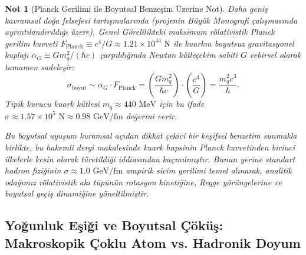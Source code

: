 \documentclass[11pt,a4paper]{article}
\newtheorem{remark}{Not}[section]
\begin{document}
\begin{remark}[Planck Gerilimi ile Boyutsal Benzeşim Üzerine Not]
    \label{rem:planck_boyut_tr}
    Daha geniş kavramsal doğa felsefesi tartışmalarında (projenin Büyük Monografi çalışmasında ayrıntılandırıldığı üzere), Genel Görelilikteki maksimum rölativistik Planck gerilim kuvveti $F_{\mathrm{Planck}} \equiv c^4/G \approx 1.21 \times 10^{44}\text{ N}$ ile kuarkın boyutsuz gravitasyonel kuplajı $\alpha_G \equiv G m_q^2 / (\hbar c)$ çarpıldığında Newton kütleçekim sabiti $G$ cebirsel olarak tamamen sadeleşir:
    \begin{equation}
        \sigma_{\mathrm{boyut}} \sim \alpha_G \cdot F_{\mathrm{Planck}} = \left( \frac{G m_q^2}{\hbar c} \right) \cdot \left( \frac{c^4}{G} \right) = \frac{m_q^2 c^3}{\hbar}.
        \label{eq:sigma_tam_analitik}
    \end{equation}
    Tipik kurucu kuark kütlesi $m_q \approx 440\text{ MeV}$ için bu ifade $\sigma \approx 1.57 \times 10^5\text{ N} \approx 0.98\text{ GeV/fm}$ değerini verir.
    
    Bu boyutsal uyuşum kuramsal açıdan dikkat çekici bir keşifsel benzetim sunmakla birlikte, bu hakemli dergi makalesinde kuark hapsinin Planck kuvvetinden birinci ilkelerle kesin olarak türetildiği iddiasından kaçınılmıştır. Bunun yerine standart hadron fiziğinin $\sigma \approx 1.0\text{ GeV/fm}$ ampirik sicim gerilimi temel alınarak, analitik odağımız rölativistik akı tüpünün rotasyon kinetiğine, Regge yörüngelerine ve boyutsal geçiş dinamiğine yöneltilmiştir.
\end{remark}

\subsection{Yoğunluk Eşiği ve Boyutsal Çöküş: Makroskopik Çoklu Atom vs. Hadronik Doyum}
\label{sec:yogunluk_ve_boyut}
\end{document}
